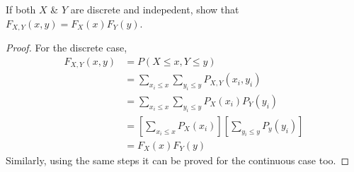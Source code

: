 \documentclass{article}
\begin{document}
If both $X$ \& $Y$ are discrete and indepedent, show that $F_{X,Y}(x,y)= F_X (x) F_Y (y)$.
\begin{proof}
    For the discrete case,
    \begin{align*}
        F_{X,Y}(x,y)&= P(X \leq x, Y \leq y) \\
        &= \sum_{x_i \leq x} \sum_{y_i \leq y} P_{X,Y}(x_i,y_i) \\
        &= \sum_{x_i \leq x} \sum_{y_i \leq y} P_{X}(x_i) P_Y(y_i) \\
        &= \left[ \sum_{x_i \leq x} P_{X}(x_i)\right] \left[ \sum_{y_i \leq y} P_{y}(y_i)\right] \\
        &= F_X (x) F_Y (y)
    \end{align*}
    Similarly, using the same steps it can be proved for the continuous case too.
\end{proof}
\end{document}
